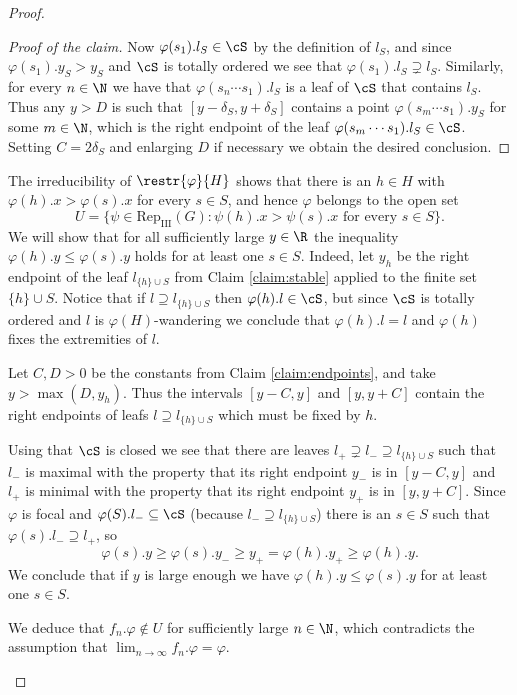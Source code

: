 \documentclass[reqno]{amsart}
\begin{document}
\begin{proof}
\begin{itemize}
\begin{proof}[Proof of the claim]
Now $\varphi(s_1).l_S \in \cS$ by the definition of $l_S$, and since $\varphi(s_1).y_S > y_S$ and $\cS$ is totally ordered we see that $\varphi(s_1).l_S \supsetneq l_S$. Similarly, for every $n \in \N$ we have that $\varphi(s_n\cdots s_1).l_S$ is a leaf of $\cS$ that contains $l_S$. Thus any $y > D$ is such that $[y - \delta_S, y + \delta_S]$ contains a point $\varphi(s_m \cdots s_1).y_S$ for some $m \in \N$, which is the right endpoint of the leaf $\varphi(s_m\cdots s_1).l_S \in \cS$. Setting $C = 2 \delta_S$ and enlarging $D$ if necessary we obtain the desired conclusion.
\end{proof}

The irreducibility of $\restr{\varphi}{H}$ shows that there is an $h \in H$ with $\varphi(h).x > \varphi(s).x$ for every $s \in S$, and hence $\varphi$ belongs to the open set
\[
	U = \{\psi \in \mathrm{Rep}_\mathrm{III}(G) : \psi(h).x > \psi(s).x \text{ for every }s \in S\}.
\]
We will show that for all sufficiently large $y \in \R$ the inequality $\varphi(h).y \leq \varphi(s).y$ holds for at least one $s \in S$. Indeed, let $y_h$ be the right endpoint of the leaf $l_{\{h\} \cup S}$ from Claim \ref{claim:stable} applied to the finite set $\{h\} \cup S$. Notice that if $l \supseteq l_{\{h\} \cup S}$ then $\varphi(h).l \in \cS$, but since $\cS$ is totally ordered and $l$ is $\varphi(H)$-wandering we conclude that $\varphi(h).l = l$ and $\varphi(h)$ fixes the extremities of $l$.

 Let $C,D > 0$ be the constants from Claim \ref{claim:endpoints}, and take $y > \max(D, y_h)$. Thus the intervals $[y-C, y]$ and $[y, y+C]$ contain the right endpoints of leafs $l \supseteq l_{\{h\} \cup S}$ which must be fixed by $h$. 

Using that $\cS$ is closed we see that there are leaves $l_+ \supsetneq l_- \supseteq l_{\{h\} \cup S}$ such that $l_-$ is maximal with the property that its right endpoint $y_-$ is in $[y-C, y]$ and $l_+$ is minimal with the property that its right endpoint $y_+$ is in $[y, y+C]$. Since $\varphi$ is focal and $\varphi(S).l_- \subseteq \cS$ (because $l_- \supseteq l_{\{h\} \cup S}$) there is an $s \in S$ such that $\varphi(s).l_- \supseteq l_+$, so
\[
	\varphi(s).y \geq \varphi(s).y_- \geq y_+ = \varphi(h).y_+ \geq \varphi(h).y.
\]
We conclude that if $y$ is large enough we have $\varphi(h).y \leq \varphi(s).y$ for at least one $s \in S$.

We deduce that $f_n.\varphi \not \in U$ for sufficiently large $n \in \N$, which contradicts the assumption that $\lim_{n \to \infty} f_n.\varphi = \varphi$. \qedhere
\end{itemize}
\end{proof}
\end{document}
